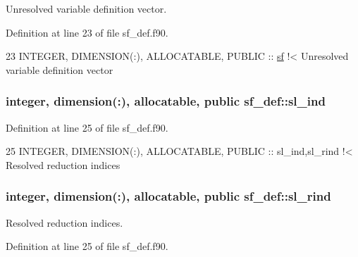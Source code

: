 Unresolved variable definition vector. 



Definition at line 23 of file sf\+\_\+def.\+f90.


\begin{DoxyCode}
23   \textcolor{keywordtype}{INTEGER}, \textcolor{keywordtype}{DIMENSION(:)}, \textcolor{keywordtype}{ALLOCATABLE}, \textcolor{keywordtype}{PUBLIC} :: \hyperlink{namespacesf__def_ad000452ff3b9c4c5ce070c04d0521b52}{sf}\textcolor{comment}{              !< Unresolved variable definition vector}
\end{DoxyCode}
\subsubsection[{\texorpdfstring{sl\+\_\+ind}{sl_ind}}]{\setlength{\rightskip}{0pt plus 5cm}integer, dimension(\+:), allocatable, public sf\+\_\+def\+::sl\+\_\+ind}\hypertarget{namespacesf__def_a6b226546e7059222fad5500946c1c550}{}\label{namespacesf__def_a6b226546e7059222fad5500946c1c550}


Definition at line 25 of file sf\+\_\+def.\+f90.


\begin{DoxyCode}
25   \textcolor{keywordtype}{INTEGER}, \textcolor{keywordtype}{DIMENSION(:)}, \textcolor{keywordtype}{ALLOCATABLE}, \textcolor{keywordtype}{PUBLIC} :: sl\_ind,sl\_rind\textcolor{comment}{  !< Resolved reduction indices }
\end{DoxyCode}
\subsubsection[{\texorpdfstring{sl\+\_\+rind}{sl_rind}}]{\setlength{\rightskip}{0pt plus 5cm}integer, dimension(\+:), allocatable, public sf\+\_\+def\+::sl\+\_\+rind}\hypertarget{namespacesf__def_aab6ba7881cef9b469ab9d9323f3fcbea}{}\label{namespacesf__def_aab6ba7881cef9b469ab9d9323f3fcbea}


Resolved reduction indices. 



Definition at line 25 of file sf\+\_\+def.\+f90.

